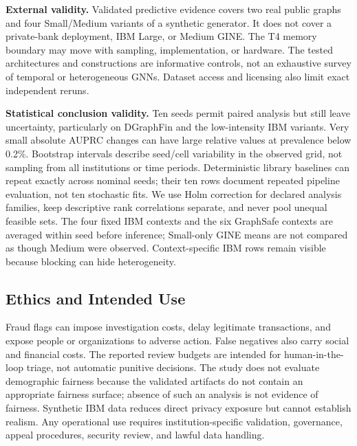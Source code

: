 \textbf{External validity.} Validated predictive evidence covers two real public graphs and four Small/Medium variants of a synthetic generator. It does not cover a private-bank deployment, IBM Large, or Medium GINE. The T4 memory boundary may move with sampling, implementation, or hardware. The tested architectures and constructions are informative controls, not an exhaustive survey of temporal or heterogeneous GNNs. Dataset access and licensing also limit exact independent reruns.

\textbf{Statistical conclusion validity.} Ten seeds permit paired analysis but still leave uncertainty, particularly on DGraphFin and the low-intensity IBM variants. Very small absolute AUPRC changes can have large relative values at prevalence below 0.2\%. Bootstrap intervals describe seed/cell variability in the observed grid, not sampling from all institutions or time periods. Deterministic library baselines can repeat exactly across nominal seeds; their ten rows document repeated pipeline evaluation, not ten stochastic fits. We use Holm correction for declared analysis families, keep descriptive rank correlations separate, and never pool unequal feasible sets. The four fixed IBM contexts and the six GraphSafe contexts are averaged within seed before inference; Small-only GINE means are not compared as though Medium were observed. Context-specific IBM rows remain visible because blocking can hide heterogeneity.

\subsection{Ethics and Intended Use}

Fraud flags can impose investigation costs, delay legitimate transactions, and expose people or organizations to adverse action. False negatives also carry social and financial costs. The reported review budgets are intended for human-in-the-loop triage, not automatic punitive decisions. The study does not evaluate demographic fairness because the validated artifacts do not contain an appropriate fairness surface; absence of such an analysis is not evidence of fairness. Synthetic IBM data reduces direct privacy exposure but cannot establish realism. Any operational use requires institution-specific validation, governance, appeal procedures, security review, and lawful data handling.
